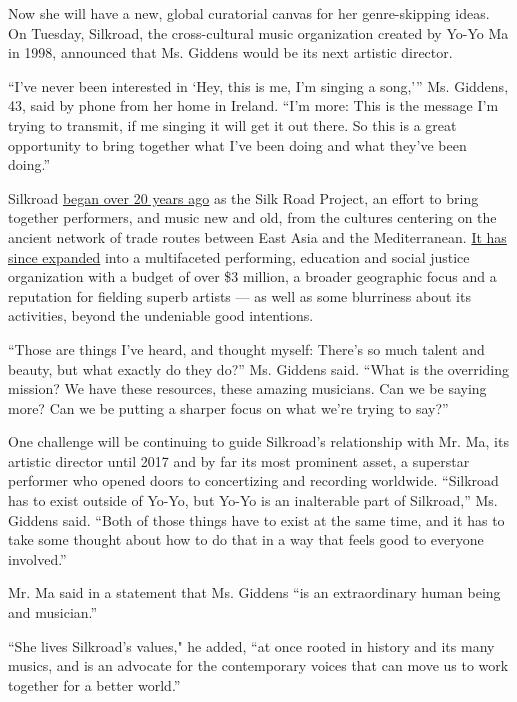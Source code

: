 Now she will have a new, global curatorial canvas for her genre-skipping
ideas. On Tuesday, Silkroad, the cross-cultural music organization
created by Yo-Yo Ma in 1998, announced that Ms. Giddens would be its
next artistic director.

``I've never been interested in `Hey, this is me, I'm singing a song,'''
Ms. Giddens, 43, said by phone from her home in Ireland. ``I'm more:
This is the message I'm trying to transmit, if me singing it will get it
out there. So this is a great opportunity to bring together what I've
been doing and what they've been doing.''

Silkroad
\href{https://www.nytimes3xbfgragh.onion/2000/10/25/arts/a-multicultural-project-takes-a-high-road-the-silk-road.html}{began
over 20 years ago} as the Silk Road Project, an effort to bring together
performers, and music new and old, from the cultures centering on the
ancient network of trade routes between East Asia and the Mediterranean.
\href{https://www.silkroad.org/}{It has since expanded} into a
multifaceted performing, education and social justice organization with
a budget of over \$3 million, a broader geographic focus and a
reputation for fielding superb artists --- as well as some blurriness
about its activities, beyond the undeniable good intentions.

``Those are things I've heard, and thought myself: There's so much
talent and beauty, but what exactly do they do?'' Ms. Giddens said.
``What is the overriding mission? We have these resources, these amazing
musicians. Can we be saying more? Can we be putting a sharper focus on
what we're trying to say?''

One challenge will be continuing to guide Silkroad's relationship with
Mr. Ma, its artistic director until 2017 and by far its most prominent
asset, a superstar performer who opened doors to concertizing and
recording worldwide. ``Silkroad has to exist outside of Yo-Yo, but Yo-Yo
is an inalterable part of Silkroad,'' Ms. Giddens said. ``Both of those
things have to exist at the same time, and it has to take some thought
about how to do that in a way that feels good to everyone involved.''

Mr. Ma said in a statement that Ms. Giddens ``is an extraordinary human
being and musician.''

``She lives Silkroad's values," he added, ``at once rooted in history
and its many musics, and is an advocate for the contemporary voices that
can move us to work together for a better world.''

